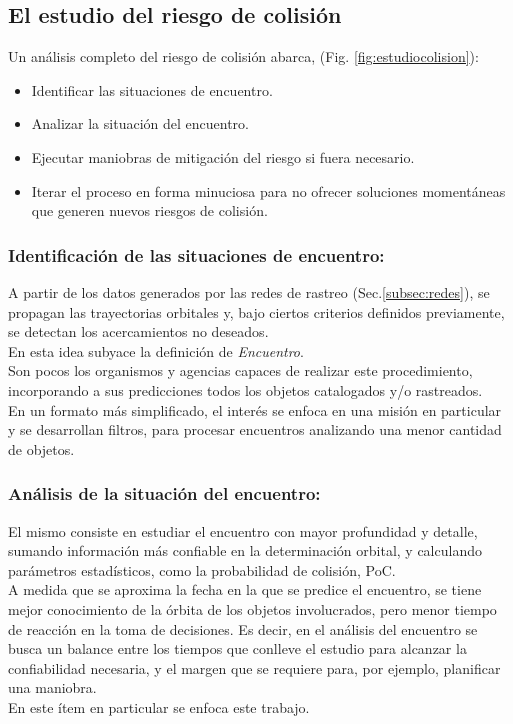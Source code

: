 \subsection{El estudio del riesgo de colisi\'on}\label{subsec:estudiocolision}

Un an\'alisis completo del riesgo de colisi\'on abarca, (Fig. \ref{fig:estudiocolision}):

\begin{itemize}
\setlength{\itemsep}{0pt}
\item Identificar las situaciones de encuentro.
\item Analizar la situaci\'on del encuentro.
\item Ejecutar maniobras de mitigaci\'on del riesgo si fuera necesario.
\item Iterar el proceso en forma minuciosa para no ofrecer soluciones moment\'aneas que generen nuevos riesgos de colisi\'on.
\end{itemize}

\subsubsection*{Identificaci\'on de las situaciones de encuentro:}
A partir de los datos generados por las redes de rastreo (Sec.\ref{subsec:redes}), se propagan las trayectorias orbitales y, bajo ciertos criterios definidos previamente, se detectan los acercamientos no deseados.\\
En esta idea subyace la definici\'on de {\it{Encuentro}}.\\
Son pocos los organismos y agencias capaces de realizar este procedimiento, incorporando a sus predicciones todos los objetos catalogados y/o rastreados.\\
En un formato m\'as simplificado, el inter\'es se enfoca en una misi\'on en particular y se desarrollan filtros, para procesar encuentros analizando una menor cantidad de objetos.\\


\subsubsection*{An\'alisis de la situaci\'on del encuentro: }
El mismo consiste en estudiar el encuentro con mayor profundidad y detalle, sumando informaci\'on m\'as confiable en la determinaci\'on orbital, y calculando par\'ametros estad\'isticos, como la probabilidad de colisi\'on, \ac{PoC}.\\
A medida que se aproxima la fecha en la que se predice el encuentro, se tiene mejor conocimiento de la \'orbita de los objetos involucrados, pero menor tiempo de reacci\'on en la toma de decisiones. Es decir, en el an\'alisis del encuentro se busca un balance entre los tiempos que conlleve el estudio para alcanzar la confiabilidad necesaria, y el margen que se requiere para, por ejemplo, planificar una maniobra.\\
En este \'item en particular se enfoca este trabajo.\\

